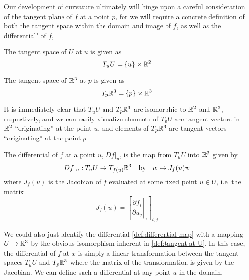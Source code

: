     Our development of curvature ultimately will hinge upon a careful consideration of the tangent plane of $f$ at a point $p$, for we will require a concrete definition of both the tangent space within the domain and image of $f$,
    as well as the differential" of $f$,
    
    
    \begin{defn} The tangent space of $U$ at $u$ is given as \label{def:tangent-at-U}
    	\[ T_{u} U = \left\{u\right\} \times \mathbb{R}^2
    	\]
    	\end{defn}
    \begin{defn} The tangent space of $\mathbb{R}^3$ at $p$ is given as \label{def:tangent-of-R3}
    	\[ T_{p} \mathbb{R}^3 = \{p\} \times \mathbb{R}^3
    	\]
    \end{defn}
    It is immediately clear that $T_uU$ and $T_p\mathbb{R}^3$ are isomorphic to
    $\mathbb{R}^2$ and $\mathbb{R}^3$, respectively, and we can easily visualize elements of $T_uU$ are tangent vectors in $\mathbb{R}^2$ ``originating'' at the point $u$, and elements of $T_p\mathbb{R}^3$ are tangent vectors ``originating'' at the point $p$.
\begin{defn} The differential of $f$ at a point $u$, \label{def:differential-map}
       	$Df\vert_u$, is the map from $T_uU$ into $\mathbb{R}^3$ given by
    \[
     Df|_u : T_uU \to T_{f(u)}\mathbb{R}^3
     \quad \textrm{by}
     \quad w \mapsto J_f (u) w
    \]
where $J_f(u)$ is the Jacobian of $f$ evaluated at some fixed point $u \in U$, i.e. the matrix
\[
J_f (u) = \left[ \left.\frac{\partial f_i}{\partial u_j}\right\vert_u \right]_{i,j}
\]
\end{defn} %
We could also just identify the differential \cref{def:differential-map}  with a mapping $U \to \mathbb{R}^3$ by the obvious isomorphism inherent in \cref{def:tangent-at-U}. In this case, the differential of $f$ at $x$ is simply a linear transformation between the tangent spaces $T_uU$ and $T_p\mathbb{R}^3$ where the matrix of the transformation is given by the Jacobian. We can define such a differential at any point $u$ in the domain.

